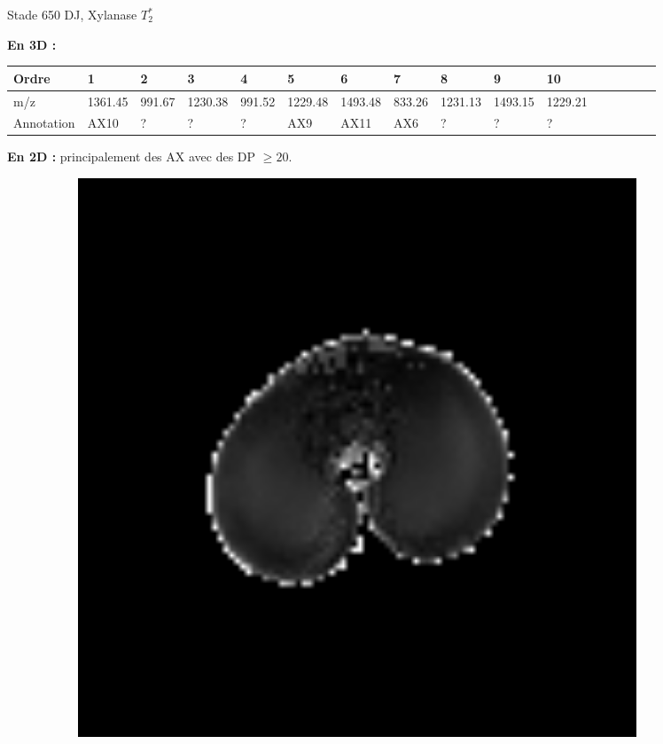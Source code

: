 \documentclass[10pt]{beamer}
\begin{document}
\begin{frame}{Stade 650 DJ, Xylanase}
  \textbf{$T_2^*$}
  
  \textbf{En 3D :}
  \vspace{-0.4cm}
    \begin{table}[]
    \centering
    \begin{adjustbox}{max width=1\textwidth}
      \begin{tabular}{llllllllllllllll}
        \toprule
        Ordre & 1       & 2       & 3       & 4       & 5       & 6       & 7       & 8       & 9       & 10       \\
        \midrule
        m/z &       1361.45 & 991.67 & 1230.38 & 991.52 & 1229.48 & 1493.48 & 833.26 & 1231.13 & 1493.15 & 1229.21 \\
        Annotation &  AX10 & ? & ? & ? & AX9 & AX11 & AX6 & ?  & ? & ?\\
        \bottomrule
      \end{tabular}
    \end{adjustbox}
  \end{table}


  \textbf{En 2D :} principalement des AX avec des DP $\geq 20$.

  \begin{figure}[ht]
    \centering
    \begin{subfigure}[t]{0.33\textwidth}
      \centering
      \includegraphics[width=0.9\textwidth]{fig/stats_650Xyl_t2_irm}


\end{subfigure}
\end{figure}
\end{frame}
\end{document}
